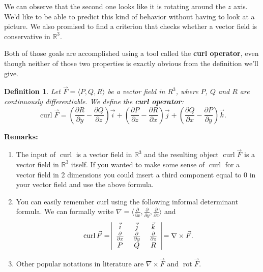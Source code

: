 \documentclass[12pt]{article}
\newcommand{\p}{\partial}
\newcommand{\R}{ \mathbb{R}}
\newcommand{\vF}{\vec{F}}
\renewcommand{\lg}{\langle}
\newcommand{\rg}{\rangle}
\newcommand{\vi}{\vec{i}}
\newcommand{\vj}{\vec{j}}
\newcommand{\vk}{\vec{k}}
\DeclareMathOperator{\curl}{curl}
\newcommand{\n}{\nabla}
\newcommand{\px}{\frac{\p }{\p x}}
\newcommand{\py}{\frac{\p }{\p y}}
\newcommand{\pz}{\frac{\p }{\p z}}
\DeclareMathOperator{\rot}{rot}
\newtheorem{defn}{Definition}
\begin{document}
We can observe that the second one looks like it is rotating around the $z$ axis. We'd like to be able to predict this kind of behavior without having to look at a picture.  We also promised to find a criterion that checks whether a vector field is conservative in $\R^3$.

Both of those goals are accomplished using a tool called the \textbf{curl operator}, even though neither of those two properties is exactly obvious from the definition we'll give.

\begin{defn}
Let $\vF=\lg P,Q,R\rg $ be a vector field in $R^3$, where $P$, $Q$ and $R$ are continuously differentiable. We define the \textbf{curl operator}: \begin{equation}
\curl \vF=\left(\frac{\p R}{\p y}-\frac{\p Q}{\p z}\right)\vi +\left (\frac{\p P}{\p z}-\frac{\p R}{\p x}\right )\vj+\left( \frac{\p Q}{\p x}-\frac{\p P}{\p y}\right )\vk.
\end{equation} 
\end{defn}

\textbf{Remarks:}
\begin{enumerate}
\item The input of $\curl $ is a vector field in $\R^3$ and the resulting object $\curl\vF$ is a vector field in $\R^3$  itself. If you wanted to make some sense of $\curl $ for a vector field in 2 dimensions you could insert a third component equal to 0 in your vector field and use the above formula.
\item You can easily remember curl using the following informal determinant formula. We can formally write $\n=\lg \px,\py,\pz\rg$ and \begin{equation}
\curl \vF=\begin{tabular}{|c c c|}
$\vi$ & $\vj$ & $\vk$ \\ 
$\px$ & $\py$ & $\pz$ \\
$P$ & $Q$ & $R$ \\ 
\end{tabular} =\n\times\vF.\label{eqn1}
\end{equation}
\item Other popular notations in literature are $\n\times\vF$ and $\rot \vF$.
\end{enumerate}
\end{document}
